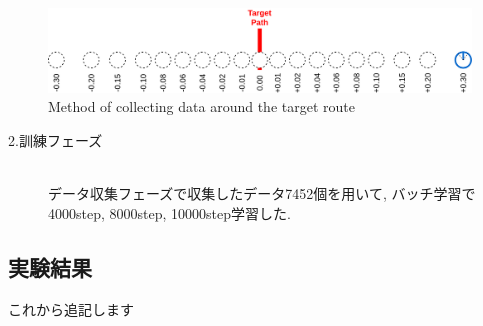 \begin{figure}[h]
  \centering
  \includegraphics[keepaspectratio, scale=0.18]{images/collect-data.png}
  \caption{Method of collecting data around the target route}
  \label{Fig:collect-data}
  \end{figure}

\begin{description}
  \item[2.訓練フェーズ]\mbox{}\\データ収集フェーズで収集したデータ7452個を用いて, バッチ学習で4000step, 8000step, 10000step学習した. 
\end{description}

\newpage
\subsection{実験結果}
これから追記します


